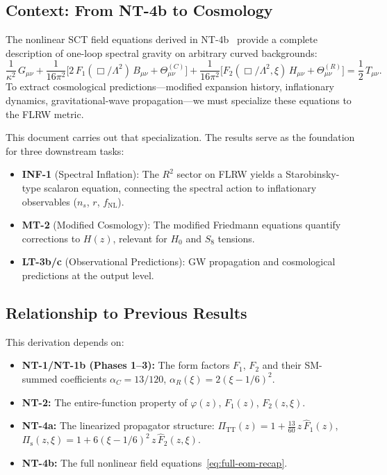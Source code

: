 \documentclass[11pt,a4paper]{article}
\theoremstyle{plain}
\theoremstyle{definition}
\begin{document}
\subsection{Context: From NT-4b to Cosmology}

The nonlinear SCT field equations derived in NT-4b~\cite{NT4b} provide a
complete description of one-loop spectral gravity on arbitrary curved
backgrounds:
\begin{equation}\label{eq:full-eom-recap}
  \frac{1}{\kappa^2}\,G_{\mu\nu}
  + \frac{1}{16\pi^2}\bigl[2\,F_1(\Box/\Lambda^2)\,B_{\mu\nu}
    + \Theta^{(C)}_{\mu\nu}\bigr]
  + \frac{1}{16\pi^2}\bigl[F_2(\Box/\Lambda^2,\xi)\,H_{\mu\nu}
    + \Theta^{(R)}_{\mu\nu}\bigr]
  = \frac{1}{2}\,T_{\mu\nu}.
\end{equation}
To extract cosmological predictions---modified expansion history,
inflationary dynamics, gravitational-wave propagation---we must
specialize these equations to the FLRW metric.

This document carries out that specialization. The results serve as
the foundation for three downstream tasks:
\begin{itemize}[nosep]
  \item \textbf{INF-1} (Spectral Inflation): The $R^2$ sector on
    FLRW yields a Starobinsky-type scalaron equation, connecting the
    spectral action to inflationary observables ($n_s$, $r$, $f_{\mathrm{NL}}$).
  \item \textbf{MT-2} (Modified Cosmology): The modified Friedmann
    equations quantify corrections to $H(z)$, relevant for
    $H_0$ and $S_8$ tensions.
  \item \textbf{LT-3b/c} (Observational Predictions): GW propagation
    and cosmological predictions at the output level.
\end{itemize}

\subsection{Relationship to Previous Results}

This derivation depends on:
\begin{itemize}[nosep]
  \item \textbf{NT-1/NT-1b (Phases 1--3):} The form factors $F_1$, $F_2$
    and their SM-summed coefficients $\alpha_C = 13/120$,
    $\alpha_R(\xi) = 2(\xi - 1/6)^2$.
  \item \textbf{NT-2:} The entire-function property of $\varphi(z)$,
    $F_1(z)$, $F_2(z,\xi)$.
  \item \textbf{NT-4a:} The linearized propagator structure:
    $\Pi_{\mathrm{TT}}(z) = 1 + \frac{13}{60}\,z\,\hat{F}_1(z)$,
    $\Pi_{\mathrm{s}}(z,\xi) = 1 + 6(\xi - 1/6)^2\,z\,\hat{F}_2(z,\xi)$.
  \item \textbf{NT-4b:} The full nonlinear field
    equations~\eqref{eq:full-eom-recap}.
\end{itemize}
\end{document}
